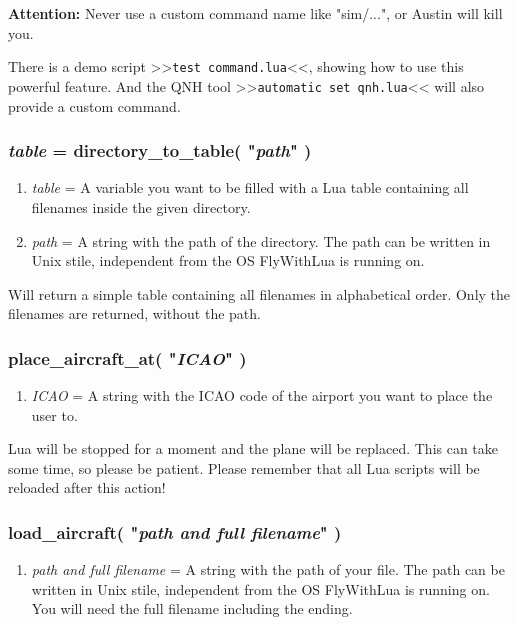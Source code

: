 \documentclass[11pt,parskip=half,a4paper]{scrartcl}
\begin{document}
\textbf{Attention:} Never use a custom command name like "sim/...", or Austin will kill you.

There is a demo script >>\verb|test command.lua|<<, showing how to use this powerful feature. And the QNH tool >>\verb|automatic set qnh.lua|<< will also provide a custom command. 

\subsubsection{\emph{table} = directory\_to\_table( "\emph{path}" )}

\begin{enumerate}
	\item \emph{table} = A variable you want to be filled with a Lua table containing all filenames inside the given directory.
	\item \emph{path} = A string with the path of the directory. The path can be written in Unix stile, independent from the OS FlyWithLua is running on.
\end{enumerate}

Will return a simple table containing all filenames in alphabetical order. Only the filenames are returned, without the path.

\subsubsection{place\_aircraft\_at( "\emph{ICAO}" )}

\begin{enumerate}
	\item \emph{ICAO} = A string with the ICAO code of the airport you want to place the user to.
\end{enumerate}

Lua will be stopped for a moment and the plane will be replaced. This can take some time, so please be patient. Please remember that all Lua scripts will be reloaded after this action!

\subsubsection{load\_aircraft( "\emph{path and full filename}" )}

\begin{enumerate}
	\item \emph{path and full filename} = A string with the path of your file. The path can be written in Unix stile, independent from the OS FlyWithLua is running on. You will need the full filename including the ending.
\end{enumerate}
\end{document}
